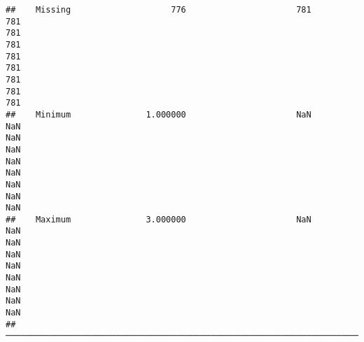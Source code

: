 \documentclass[
]{article}
\begin{document}
\begin{verbatim}
##    Missing                    776                      781                                                                  781                                                                  781                                                                  781                                                                  781                                                                  781                                                                  781                                                                  781                                                                  781   
##    Minimum               1.000000                      NaN                                                                  NaN                                                                  NaN                                                                  NaN                                                                  NaN                                                                  NaN                                                                  NaN                                                                  NaN                                                                  NaN   
##    Maximum               3.000000                      NaN                                                                  NaN                                                                  NaN                                                                  NaN                                                                  NaN                                                                  NaN                                                                  NaN                                                                  NaN                                                                  NaN   
##  ───────────────────────────────────────────────────────────────────────────────────────────────────────────────────────────────────────────────────────────────────────────────────────────────────────────────────────────────────────────────────────────────────────────────────────────────────────────────────────────────────────────────────────────────────────────────────────────────────────────────────────────────────────────────────────────────────────────────────────────────────────────────────────────────────────────────────────────────────────────────────────────────────────────────────────────────────
\end{verbatim}
\end{document}
